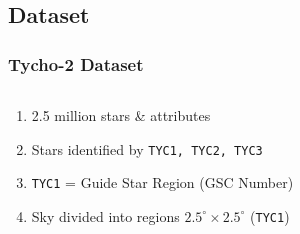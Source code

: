 \documentclass[11pt]{beamer}
\begin{document}
    \subsection{Dataset}\label{subsec:dataset}
    \begin{frame}
        \frametitle{Tycho-2 Dataset}
        \begin{columns}
            \begin{column}{0.5\textwidth}
                \begin{enumerate}
                    \item 2.5 million stars \& attributes \bigskip
                    \item Stars identified by \texttt{TYC1, TYC2, TYC3} \bigskip
                    \item \texttt{TYC1} = Guide Star Region (GSC Number) \bigskip
                    \item Sky divided into regions $2.5^\circ \times 2.5^\circ$ (\texttt{TYC1})
                \end{enumerate}
            \end{column}
            \begin{column}{0.5\textwidth}
            \end{column}
        \end{columns}
    \end{frame}
\end{document}
